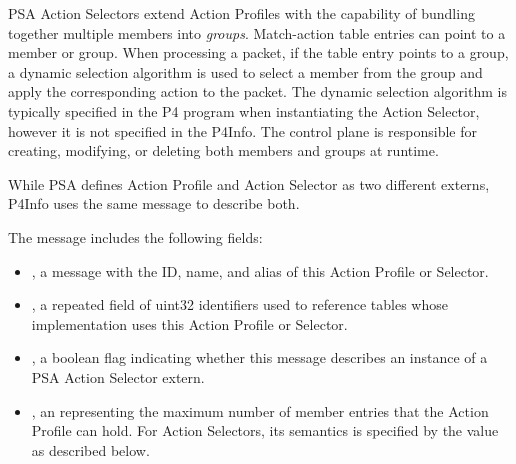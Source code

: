 \documentclass[11pt]{article}
\begin{document}
{%
PSA Action Selectors extend Action Profiles with the capability of bundling
together multiple members into \emph{groups}. Match-action table entries can point to
a member or group. When processing a packet, if the table entry points to a
group, a dynamic selection algorithm is used to select a member from the group
and apply the corresponding action to the packet. The dynamic selection
algorithm is typically specified in the P4 program when instantiating the Action
Selector, however it is not specified in the P4Info. The control plane is
responsible for creating, modifying, or deleting both members and groups at
runtime.%

While PSA defines Action Profile and Action Selector as two different externs,
P4Info uses the same  message to describe both.%

The  message includes the following fields:%

\begin{itemize}%

\item{}
, a  message with the ID, name, and alias of this Action
Profile or Selector.%

\item{}
, a repeated field of uint32 identifiers used to reference tables
whose implementation uses this Action Profile or Selector.%

\item{}
, a boolean flag indicating whether this message describes an
instance of a PSA Action Selector extern.%

\item{}
, an  representing the maximum number of member entries that the
Action Profile can hold. For Action Selectors, its semantics is specified by
the  value as described below.%


\end{itemize}}
\end{document}

